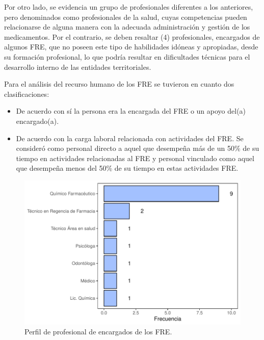 \documentclass[
]{book}
\begin{document}
Por otro lado, se evidencia un grupo de profesionales diferentes a los anteriores, pero denominados como profesionales de la salud, cuyas competencias pueden relacionarse de alguna manera con la adecuada administración y gestión de los medicamentos. Por el contrario, se deben resaltar (4) profesionales, encargados de algunos FRE, que no poseen este tipo de habilidades idóneas y apropiadas, desde su formación profesional, lo que podría resultar en dificultades técnicas para el desarrollo interno de las entidades territoriales.

Para el análisis del recurso humano de los FRE se tuvieron en cuanto dos clasificaciones:

\begin{itemize}
\item
  De acuerdo con sí la persona era la encargada del FRE o un apoyo del(a) encargado(a).
\item
  De acuerdo con la carga laboral relacionada con actividades del FRE. Se consideró como personal directo a aquel que desempeña más de un 50\% de su tiempo en actividades relacionadas al FRE y personal vinculado como aquel que desempeña menos del 50\% de su tiempo en estas actividades FRE.
\end{itemize}

\begin{figure}[t]

{\centering \includegraphics[width=1\linewidth]{InformeFinal_files/figure-latex/perfilProfesionalEncargado-1} 

}

\caption{Perfil de profesional de encargados de los FRE.}\label{fig:perfilProfesionalEncargado}
\end{figure}
\end{document}
